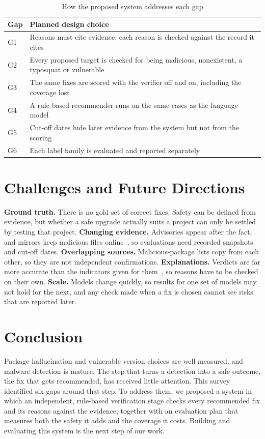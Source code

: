 \documentclass[conference]{IEEEtran}
\begin{document}
\begin{table}[t]
\caption{How the proposed system addresses each gap}
\label{tab:design}
\centering
\small
\begin{tabular}{@{}p{8mm}p{76mm}@{}}
\toprule
Gap & Planned design choice \\
\midrule
G1 & Reasons must cite evidence; each reason is checked against the record it cites \\
G2 & Every proposed target is checked for being malicious, nonexistent, a typosquat or vulnerable \\
G3 & The same fixes are scored with the verifier off and on, including the coverage lost \\
G4 & A rule-based recommender runs on the same cases as the language model \\
G5 & Cut-off dates hide later evidence from the system but not from the scoring \\
G6 & Each label family is evaluated and reported separately \\
\bottomrule
\end{tabular}
\end{table}

\section{Challenges and Future Directions}
\label{sec:future}
\textbf{Ground truth.} There is no gold set of correct fixes. Safety can be defined from evidence, but whether a
safe upgrade actually suits a project can only be settled by testing that project. \textbf{Changing evidence.}
Advisories appear after the fact, and mirrors keep malicious files online~\cite{guo2023}, so evaluations need
recorded snapshots and cut-off dates. \textbf{Overlapping sources.} Malicious-package lists copy from each other,
so they are not independent confirmations. \textbf{Explanations.} Verdicts are far more accurate than the
indicators given for them~\cite{ryan2026}, so reasons have to be checked on their own. \textbf{Scale.} Models
change quickly, so results for one set of models may not hold for the next, and any check made when a fix is
chosen cannot see risks that are reported later.

\section{Conclusion}
Package hallucination and vulnerable version choices are well measured, and malware detection is mature. The step
that turns a detection into a safe outcome, the fix that gets recommended, has received little attention. This
survey identified six gaps around that step. To address them, we proposed a system in which an independent,
rule-based verification stage checks every recommended fix and its reasons against the evidence, together with an
evaluation plan that measures both the safety it adds and the coverage it costs. Building and evaluating this system is the next step
of our work.
\end{document}
